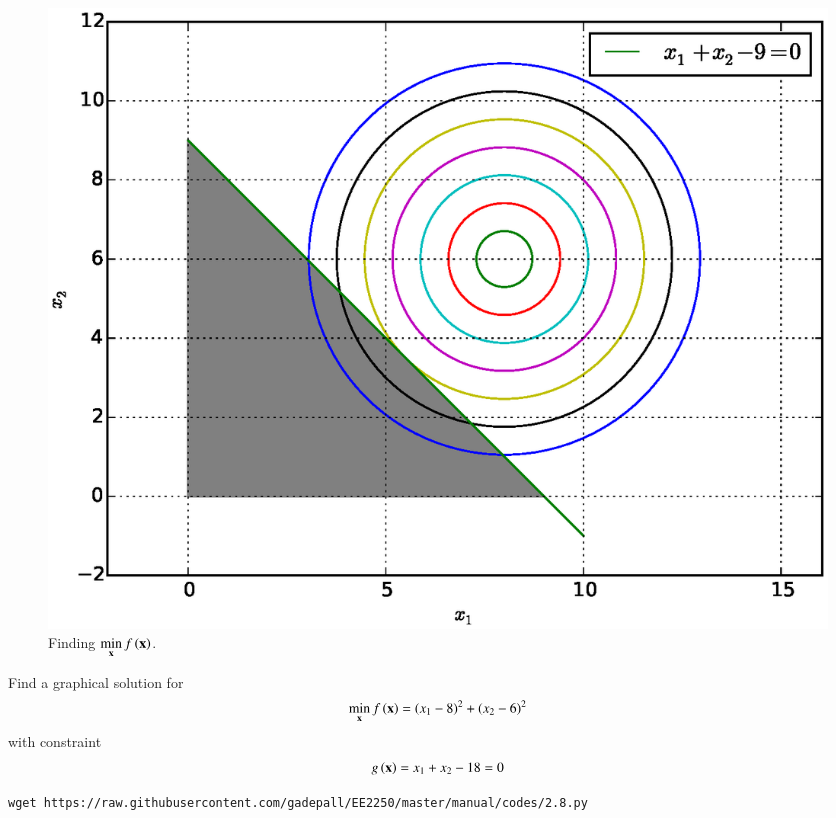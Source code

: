 \documentclass[journal,12pt,twocolumn]{IEEEtran}
\begin{document}
%
\begin{figure}[h]
\centering
\includegraphics[width=\columnwidth]{./figs/2.7.eps}
\caption{ Finding $ \displaystyle \min_{\mathbf{x}}f\left(\mathbf{x}\right)$.}
\label{fig.2.7}	
\end{figure}

%
\begin{problem}
\label{ch2_prob_upper}
Find a graphical solution for 	 
	 \begin{align}
	 \label{ch2_second_min}
	\min_{\mathbf{x}} f\left(\mathbf{x}\right) = (x_1-8)^2 + (x_2-6)^2
	 \end{align}
	 with constraint
	 \begin{align}
	 \label{ch2_second_const}
	 g\left(\mathbf{x}\right) = x_1 + x_2 - 18 = 0
	 \end{align}
\end{problem}	 
%
\solution
%	
\begin{lstlisting}
wget https://raw.githubusercontent.com/gadepall/EE2250/master/manual/codes/2.8.py
\end{lstlisting}
\end{document}
